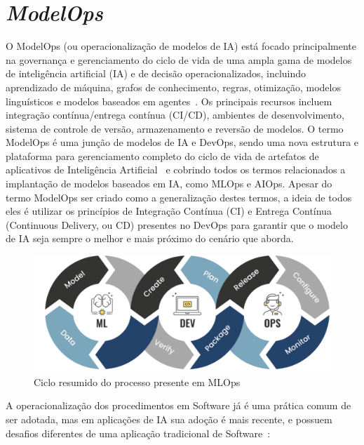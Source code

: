\documentclass[portugues]{ic-tese}
\begin{document}
\section{\textit{ModelOps}}
\label{app:ModelOps}

O ModelOps (ou operacionalização de modelos de IA) está focado principalmente na governança e gerenciamento do ciclo de vida de uma ampla gama de modelos de inteligência artificial (IA) e de decisão operacionalizados, incluindo aprendizado de máquina, grafos de conhecimento, regras, otimização, modelos linguísticos e modelos baseados em agentes~\cite{Gartner_2022}. Os principais recursos incluem integração contínua/entrega contínua (CI/CD), ambientes de desenvolvimento, sistema de controle de versão, armazenamento e reversão de modelos. O termo ModelOps é uma junção de modelos de IA e DevOps, sendo uma nova estrutura e plataforma para gerenciamento completo do ciclo de vida de artefatos de aplicativos de Inteligência Artificial~\cite{Hummer_2019} e cobrindo todos os termos relacionados a implantação de modelos baseados em IA, como MLOps e AIOps. Apesar do termo ModelOps ser criado como a generalização destes termos, a ideia de todos eles é utilizar os princípios de Integração Contínua (CI) e Entrega Contínua (Continuous Delivery, ou CD) presentes no DevOps para garantir que o modelo de IA seja sempre o melhor e mais próximo do cenário que aborda.

\begin{figure}[H]
\centering
\includegraphics[scale=0.7]{images/code-validate-deploy-loop.png}
\caption {Ciclo resumido do processo presente em MLOps}
\label{fig:MLOpsLoop}
\end{figure}

A operacionalização dos procedimentos em Software já é uma prática comum de ser adotada, mas em aplicações de IA sua adoção é mais recente, e possuem desafios diferentes de uma aplicação tradicional de Software~\cite{Sculley_2015}:
\end{document}
